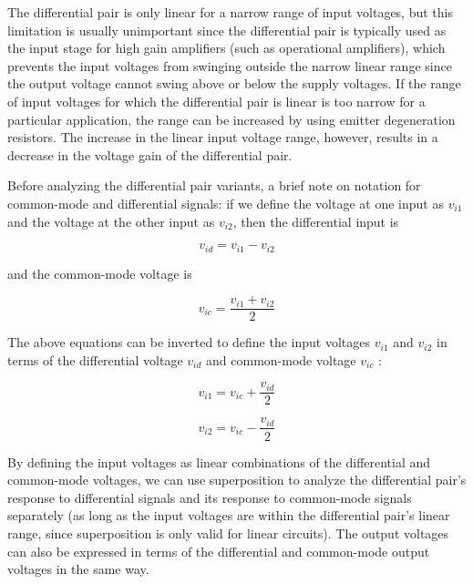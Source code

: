 The differential pair is only linear for a narrow range of input voltages, but this limitation is usually unimportant since the differential pair is typically used as the input stage for high gain amplifiers (such as operational amplifiers), which prevents the input voltages from swinging outside the narrow linear range since the output voltage cannot swing above or below the supply voltages.
If the range of input voltages for which the differential pair is linear is too narrow for a particular application, the range can be increased by using emitter degeneration resistors.
The increase in the linear input voltage range, however, results in a decrease in the voltage gain of the differential pair. \autocite[216-218]{analysis-design-analog-ics}

Before analyzing the differential pair variants, a brief note on notation for common-mode and differential signals: if we define the voltage at one input as $v_{i1}$ and the voltage at the other input as $v_{i2}$, then the differential input is

\begin{equation}
v_{id} = v_{i1}-v_{i2}
\end{equation}

\noindent and the common-mode voltage is

\begin{equation}
v_{ic} = \frac{v_{i1}+v_{i2}}{2}
\end{equation}

The above equations can be inverted to define the input voltages $v_{i1}$ and $v_{i2}$ in terms of the differential voltage $v_{id}$ and common-mode voltage $v_{ic}$ \autocite[222]{analysis-design-analog-ics}:

\begin{equation}
v_{i1} = v_{ic}+\frac{v_{id}}{2}
\end{equation}

\begin{equation}
v_{i2} = v_{ic}-\frac{v_{id}}{2}
\end{equation}

By defining the input voltages as linear combinations of the differential and common-mode voltages, we can use superposition to analyze the differential pair's response to differential signals and its response to common-mode signals separately (as long as the input voltages are within the differential pair's linear range, since superposition is only valid for linear circuits). The output voltages can also be expressed in terms of the differential and common-mode output voltages in the same way.

